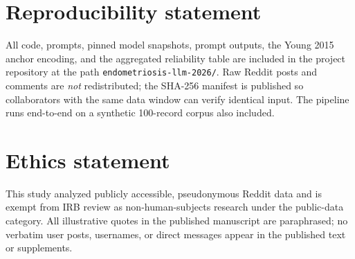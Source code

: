 \documentclass[11pt]{article}
\begin{document}
\section{Reproducibility statement}

All code, prompts, pinned model snapshots, prompt outputs, the Young
2015 anchor encoding, and the aggregated reliability table are
included in the project repository at the path
\texttt{endometriosis-llm-2026/}. Raw Reddit posts and comments are
\emph{not} redistributed; the SHA-256 manifest is published so
collaborators with the same data window can verify identical input.
The pipeline runs end-to-end on a synthetic 100-record corpus also
included.

\section{Ethics statement}

This study analyzed publicly accessible, pseudonymous Reddit data and
is exempt from IRB review as non-human-subjects research under the
public-data category. All illustrative quotes in the published
manuscript are paraphrased; no verbatim user posts, usernames, or
direct messages appear in the published text or supplements.



\end{document}
